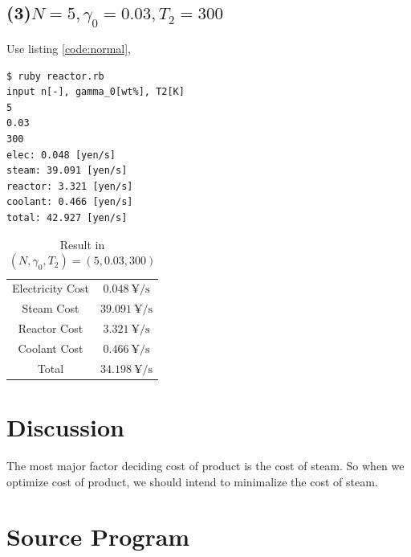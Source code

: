 \documentclass[a4paper,titlepage]{article}
\begin{document}
  \subsection*{(3)$N=5, \gamma_0=0.03, T_2 = 300$}
  Use listing \ref{code:normal},
  \begin{screen}
    \begin{verbatim}
$ ruby reactor.rb
input n[-], gamma_0[wt%], T2[K]
5
0.03
300
elec: 0.048 [yen/s]
steam: 39.091 [yen/s]
reactor: 3.321 [yen/s]
coolant: 0.466 [yen/s]
total: 42.927 [yen/s]\end{verbatim}
  \end{screen}

  \begin{table}[htbp]
    \centering
    \begin{tabular}{cc}\hline
      Electricity Cost & $\SI{0.048}{\yen\per\second}$ \\
      Steam Cost & $\SI{39.091}{\yen\per\second}$ \\
      Reactor Cost & $\SI{3.321}{\yen\per\second}$ \\
      Coolant Cost & $\SI{0.466}{\yen\per\second}$ \\
      Total & $\SI{34.198}{\yen\per\second}$ \\ \hline
    \end{tabular}
    \caption{Result in $(N, \gamma_0, T_2) = (5, 0.03, 300)$}
  \end{table}

  \section{Discussion}
  The most major factor deciding cost of product is the cost of steam. So when we optimize cost of product, we should intend to
  minimalize the cost of steam.

  \section{Source Program}
  
\end{document}

